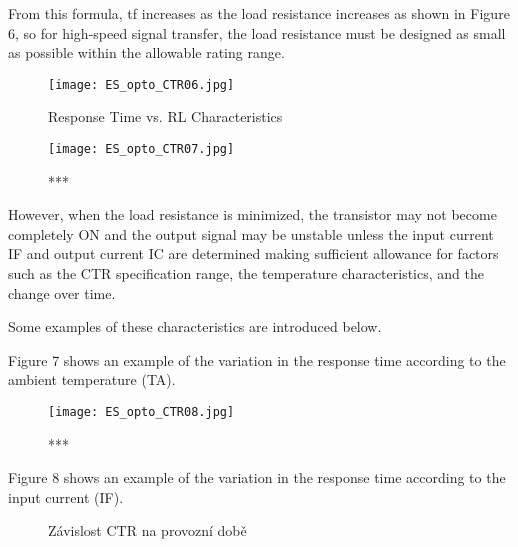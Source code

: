         From this formula, tf increases as the load resistance increases as shown in Figure 6, so
        for high-speed signal transfer, the load resistance must be designed as small as possible
        within the allowable rating range.      
         \begin{figure}[ht!]
           \centering
           \texttt{[image: ES\_opto\_CTR06.jpg]}
           \caption{Response Time vs. RL Characteristics }
           \label{es:fig_opto_CTR06}
         \end{figure}      
      
         \begin{figure}[ht!]
           \centering
           \texttt{[image: ES\_opto\_CTR07.jpg]}
           \caption{***}
           \label{es:fig_opto_CTR07}
         \end{figure}             
          However, when the load resistance is minimized, the transistor may not become completely
          ON and the output signal may be unstable unless the input current IF and output current IC
          are determined making sufficient allowance for factors such as the CTR specification
          range, the temperature characteristics, and the change over time.
                   
          Some examples of these characteristics are introduced below.      
                   
          Figure 7 shows an example of the variation in the response time according to the ambient
          temperature (TA).
         
          \begin{figure}[ht!]
            \centering
            \texttt{[image: ES\_opto\_CTR08.jpg]}
            \caption{***}
            \label{es:fig_opto_CTR08}
          \end{figure}       
          Figure 8 shows an example of the variation in the response time according to the input
          current (IF).
          
          \begin{figure*}[ht!]
             \centering
             \caption{Závislost CTR na provozní době}
             \label{ES:fig_opto_tfvsIF}
          \end{figure*}          
       
